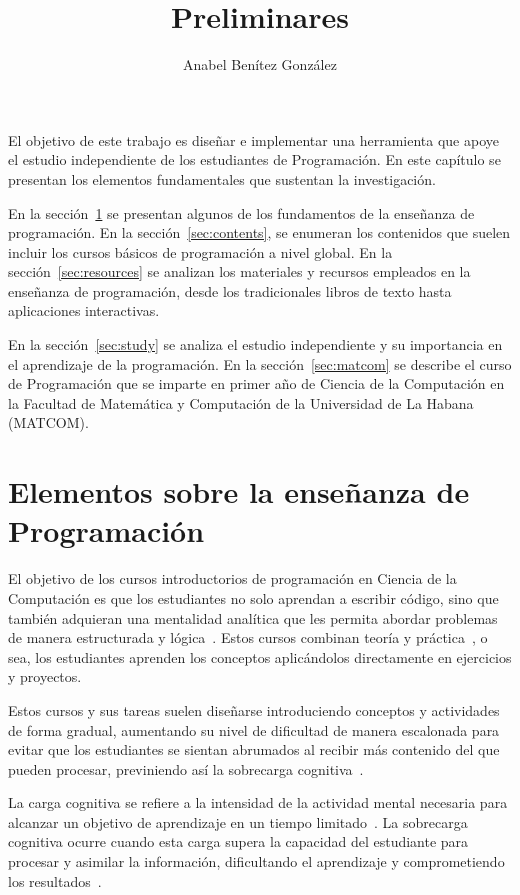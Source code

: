 \documentclass{article}
\title{Preliminares}
\author{Anabel Benítez González}
\date{}
\begin{document}

\maketitle

El objetivo de este trabajo es diseñar e implementar una herramienta que apoye el estudio independiente de los estudiantes de Programación. En este capítulo se presentan los elementos fundamentales que sustentan la investigación.

En la sección~\ref{sec:ensenanza_programacion} se presentan algunos de los fundamentos de la enseñanza de programación. En la sección~\ref{sec:contents}, se enumeran los contenidos que suelen incluir los cursos básicos de programación a nivel global. En la sección~\ref{sec:resources} se analizan los materiales y recursos empleados en la enseñanza de programación, desde los tradicionales libros de texto hasta aplicaciones interactivas.

En la sección~\ref{sec:study} se analiza el estudio independiente y su importancia en el aprendizaje de la programación. En la sección~\ref{sec:matcom} se describe el curso de Programación que se imparte en primer año de Ciencia de la Computación en la Facultad de Matemática y Computación de la Universidad de La Habana (\mbox{MATCOM}).

\section{Elementos sobre la enseñanza de Programación}\label{sec:ensenanza_programacion}

El objetivo de los cursos introductorios de programación en Ciencia de la Computación es que los estudiantes no solo aprendan a escribir código, sino que también adquieran una mentalidad analítica que les permita abordar problemas de manera estructurada y lógica~\cite{JOHNLEMAY2021100056}. Estos cursos combinan teoría y práctica~\cite{Sarsa_2022}, o sea, los estudiantes aprenden los conceptos aplicándolos directamente en ejercicios y proyectos.

Estos cursos y sus tareas suelen diseñarse introduciendo conceptos y actividades de forma gradual, aumentando su nivel de dificultad de manera escalonada para evitar que los estudiantes se sientan abrumados al recibir más contenido del que pueden procesar, previniendo así la sobrecarga cognitiva~\cite{duran2021clt}.

La carga cognitiva se refiere a la intensidad de la actividad mental necesaria para alcanzar un objetivo de aprendizaje en un tiempo limitado~\cite{duran2021clt}. La sobrecarga cognitiva ocurre cuando esta carga supera la capacidad del estudiante para procesar y asimilar la información, dificultando el aprendizaje y comprometiendo los resultados~\cite{duran2021clt}. 
\end{document}
